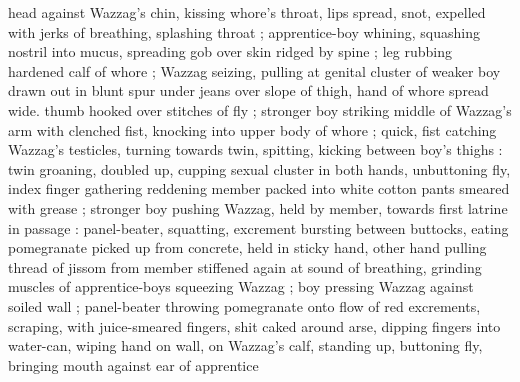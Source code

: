 head against Wazzag's chin, kissing whore's throat, lips spread, snot, expelled with jerks of breathing, splashing throat ; apprentice-boy whining, squashing nostril into mucus, spreading gob over skin ridged by spine ; leg rubbing hardened calf of whore ; Wazzag seizing, pulling at genital cluster of weaker boy drawn out in blunt spur under jeans over slope of thigh, hand of whore spread wide.  thumb hooked over stitches of fly ; stronger boy striking middle of Wazzag's arm with clenched fist, knocking into upper body of whore ; quick, fist catching Wazzag's testicles, turning towards twin, spitting, kicking between boy's thighs : twin groaning, doubled up, cupping sexual cluster in both hands, unbuttoning fly, index finger gathering reddening member packed into white cotton pants smeared with grease ; stronger boy pushing Wazzag, held by member, towards first latrine in passage : panel-beater, squatting, excrement bursting between buttocks, eating pomegranate picked up from concrete, held in sticky hand, other hand pulling thread of jissom from member stiffened again at sound of breathing, grinding muscles of apprentice-boys squeezing Wazzag ; boy pressing Wazzag against soiled wall ; panel-beater throwing pomegranate onto flow of red excrements, scraping, with juice-smeared fingers, shit caked around arse, dipping fingers into water-can, wiping hand on wall, on Wazzag's calf, standing up, buttoning fly, bringing mouth against ear of apprentice 
